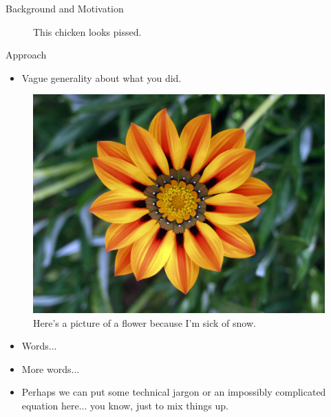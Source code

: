 \documentclass[final]{beamer}
\begin{document}
\begin{frame}[plain]{}
\begin{center}
\begin{minipage}[t]{.23\linewidth}
\begin{block}{\Large Background and Motivation}
\begin{center}
\begin{minipage}{1\linewidth}
\begin{figure}
	    \caption{\normalsize This chicken looks pissed.}
	    \label{fig:FigLabel1}
	  \end{figure}
	    \end{minipage}
	  \end{center}

	\end{block}
	\begin{block}{\Large Approach}
	\begin{itemize}
	\item Vague generality about what you did.
	\end{itemize}
	  \begin{figure} \def\figurename{Fig.}
	    \centering
	    \includegraphics[width=.9\textwidth,trim = 0cm 7cm 5cm 7cm, clip]{./figs/flower}
	    \caption{\normalsize Here's a picture of a flower because I'm sick of snow.}
	    \label{fig:Problem}
	  \end{figure}
	\end{block}
\begin{itemize}
\item Words...
\item More words...
\item Perhaps  we can put some technical jargon or an impossibly complicated equation here... you know, just to mix things up.
\end{itemize} \vspace*{1cm}
\end{minipage}\hspace{1.25cm}%
%
%
%
      \begin{minipage}[t]{.23\linewidth}


\end{minipage}
\end{center}
\end{frame}
\end{document}
